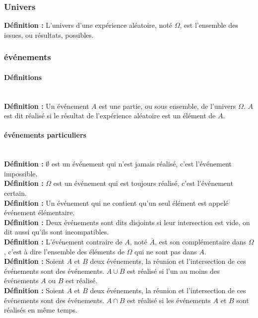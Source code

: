 \documentclass[a4paper,titlepage]{article}
\begin{document}
        \subsubsection{Univers}
            \textbf{Définition :} L’univers d’une expérience aléatoire, noté $\varOmega$, est l’ensemble des issues, ou résultats, possibles.
        \subsubsection{événements}
            \paragraph{Définitions}\mbox{}\\
                \textbf{Définition :} Un événement $A$ est une partie, ou sous ensemble, de l’univers $\varOmega$. $A$ est dit réalisé si le résultat de l’expérience aléatoire est un élément de $A$.
            \paragraph{événements particuliers}\mbox{}\\
                \textbf{Définition :} $\emptyset$ est un événement qui n’est jamais réalisé, c’est l’événement impossible.
                \\
                \textbf{Définition :} $\varOmega$ est un événement qui est toujours réalisé, c’est l’événement certain.
                \\
                \textbf{Définition :} Un événement qui ne contient qu’un seul élément est appelé événement élémentaire.
                \\
                \textbf{Définition :} Deux événements sont dits disjoints si leur intersection est vide, on dit aussi qu’ils sont incompatibles.
                \\
                \textbf{Définition :} L’événement contraire de $A$, noté $\overline{A}$, est son complémentaire dans $\varOmega$, c’est à dire l’ensemble des éléments de $\varOmega$ qui ne sont pas dans $A$.
                \\
                \textbf{Définition :} Soient $A$ et $B$ deux événements, la réunion et l’intersection de ces événements sont des événements. $A\cup B$ est réalisé si l’un au moins des événements $A$ ou $B$ est réalisé.
                \\
                \textbf{Définition :} Soient $A$ et $B$ deux événements, la réunion et l’intersection de ces événements sont des événements. $A\cap B$ est réalisé si les événements $A$ et $B$ sont réalisés en même temps.
\end{document}
